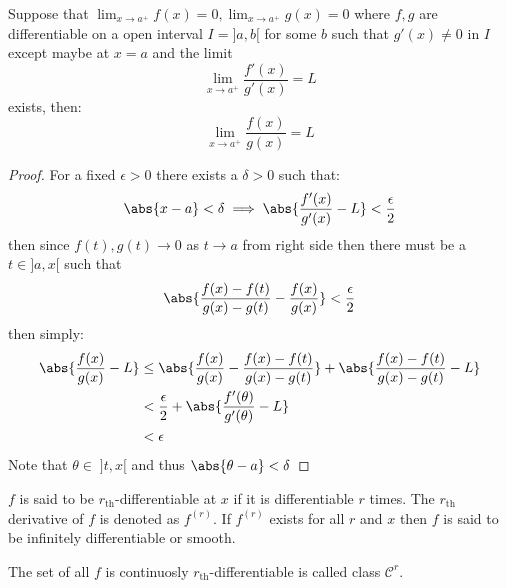 \begin{theorem}
    Suppose that \(\lim_{x \to a^+}{f(x)} = 0,\lim_{x \to a^+}{g(x)} = 0 \) where \(f,g\) are differentiable on a open interval \(I = ]a,b[\) for some \(b\) such that \(g'(x) \neq 0\) in \(I\) except maybe at \(x = a\) and the limit
    \begin{equation*}
        \lim_{x \to a^+}{\dfrac{f'(x)}{g'(x)}} = L
    \end{equation*}
    exists, then:
    \begin{equation*}
        \lim_{x \to a^+}{\dfrac{f(x)}{g(x)}} = L
    \end{equation*}
\end{theorem}
\begin{proof}
    For a fixed \(\epsilon > 0\) there exists a \(\delta > 0\) such that:
    \begin{equation*}
        \abs{x - a} < \delta \implies \abs{\dfrac{f'(x)}{g'(x)} - L} < \dfrac{ \epsilon}{2}
    \end{equation*}
    then since \(f(t), g(t) \to 0\) as \(t \to a\) from right side then there must be a \(t \in ]a,x[\) such that
    \begin{equation*}
        \abs{\dfrac{f(x) - f(t)}{g(x) - g(t)} - \dfrac{f(x)}{g(x)}} < \dfrac{\epsilon}{2}
    \end{equation*}
    then simply:
    \begin{align}
        \abs{\dfrac{f(x)}{g(x)} - L} & \leq \abs{\dfrac{f(x)}{g(x)} - \dfrac{f(x) - f(t)}{g(x) - g(t)} } + \abs{\dfrac{f(x) - f(t)}{g(x) - g(t)} - L} \\
                                     & < \dfrac{\epsilon}{2} + \abs{\dfrac{f'(\theta)}{g'(\theta)} - L}                                               \\
                                     & < \epsilon
    \end{align}
    Note that \(\theta \in \; ]t,x[\) and thus \(\abs{\theta - a} < \delta \)
\end{proof}
\begin{definition}
    \(f\) is said to be \(r_{\text{th}}\)-differentiable at \(x\) if it is differentiable \(r\) times. The \(r_{\text{th}}\) derivative of \(f\) is denoted as \(f^{(r)}\). If \(f^{(r)}\) exists for all \(r\) and \(x\) then \(f\) is said to be infinitely differentiable or smooth.
\end{definition}
\begin{definition}
    The set of all \(f\) is continuosly \(r_{\text{th}}\)-differentiable is called class \(\mathcal{C}^r\).
\end{definition}
